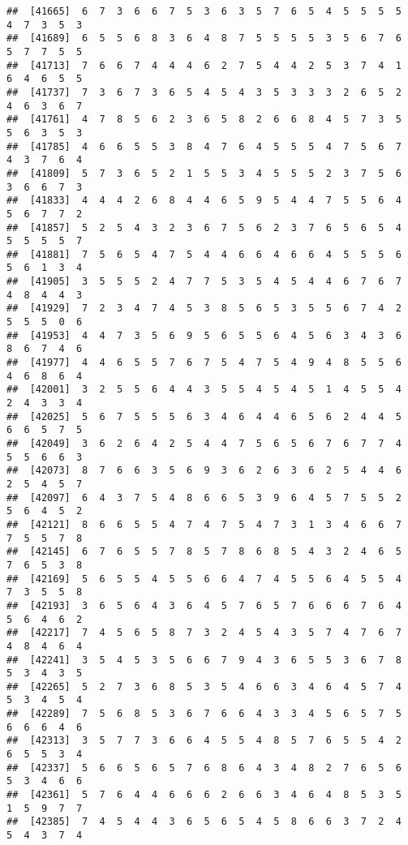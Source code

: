 \documentclass[
]{book}
\begin{document}
\begin{verbatim}
##  [41665]  6  7  3  6  6  7  5  3  6  3  5  7  6  5  4  5  5  5  5  4  7  3  5  3
##  [41689]  6  5  5  6  8  3  6  4  8  7  5  5  5  5  3  5  6  7  6  5  7  7  5  5
##  [41713]  7  6  6  7  4  4  4  6  2  7  5  4  4  2  5  3  7  4  1  6  4  6  5  5
##  [41737]  7  3  6  7  3  6  5  4  5  4  3  5  3  3  3  2  6  5  2  4  6  3  6  7
##  [41761]  4  7  8  5  6  2  3  6  5  8  2  6  6  8  4  5  7  3  5  5  6  3  5  3
##  [41785]  4  6  6  5  5  3  8  4  7  6  4  5  5  5  4  7  5  6  7  4  3  7  6  4
##  [41809]  5  7  3  6  5  2  1  5  5  3  4  5  5  5  2  3  7  5  6  3  6  6  7  3
##  [41833]  4  4  4  2  6  8  4  4  6  5  9  5  4  4  7  5  5  6  4  5  6  7  7  2
##  [41857]  5  2  5  4  3  2  3  6  7  5  6  2  3  7  6  5  6  5  4  5  5  5  5  7
##  [41881]  7  5  6  5  4  7  5  4  4  6  6  4  6  6  4  5  5  5  6  5  6  1  3  4
##  [41905]  3  5  5  5  2  4  7  7  5  3  5  4  5  4  4  6  7  6  7  4  8  4  4  3
##  [41929]  7  2  3  4  7  4  5  3  8  5  6  5  3  5  5  6  7  4  2  5  5  5  0  6
##  [41953]  4  4  7  3  5  6  9  5  6  5  5  6  4  5  6  3  4  3  6  8  6  7  4  6
##  [41977]  4  4  6  5  5  7  6  7  5  4  7  5  4  9  4  8  5  5  6  4  6  8  6  4
##  [42001]  3  2  5  5  6  4  4  3  5  5  4  5  4  5  1  4  5  5  4  2  4  3  3  4
##  [42025]  5  6  7  5  5  5  6  3  4  6  4  4  6  5  6  2  4  4  5  6  6  5  7  5
##  [42049]  3  6  2  6  4  2  5  4  4  7  5  6  5  6  7  6  7  7  4  5  5  6  6  3
##  [42073]  8  7  6  6  3  5  6  9  3  6  2  6  3  6  2  5  4  4  6  2  5  4  5  7
##  [42097]  6  4  3  7  5  4  8  6  6  5  3  9  6  4  5  7  5  5  2  5  6  4  5  2
##  [42121]  8  6  6  5  5  4  7  4  7  5  4  7  3  1  3  4  6  6  7  7  5  5  7  8
##  [42145]  6  7  6  5  5  7  8  5  7  8  6  8  5  4  3  2  4  6  5  7  6  5  3  8
##  [42169]  5  6  5  5  4  5  5  6  6  4  7  4  5  5  6  4  5  5  4  7  3  5  5  8
##  [42193]  3  6  5  6  4  3  6  4  5  7  6  5  7  6  6  6  7  6  4  5  6  4  6  2
##  [42217]  7  4  5  6  5  8  7  3  2  4  5  4  3  5  7  4  7  6  7  4  8  4  6  4
##  [42241]  3  5  4  5  3  5  6  6  7  9  4  3  6  5  5  3  6  7  8  5  3  4  3  5
##  [42265]  5  2  7  3  6  8  5  3  5  4  6  6  3  4  6  4  5  7  4  5  3  4  5  4
##  [42289]  7  5  6  8  5  3  6  7  6  6  4  3  3  4  5  6  5  7  5  6  6  6  4  6
##  [42313]  3  5  7  7  3  6  6  4  5  5  4  8  5  7  6  5  5  4  2  6  5  5  3  4
##  [42337]  5  6  6  5  6  5  7  6  8  6  4  3  4  8  2  7  6  5  6  5  3  4  6  6
##  [42361]  5  7  6  4  4  6  6  6  2  6  6  3  4  6  4  8  5  3  5  1  5  9  7  7
##  [42385]  7  4  5  4  4  3  6  5  6  5  4  5  8  6  6  3  7  2  4  5  4  3  7  4

\end{verbatim}
\end{document}
